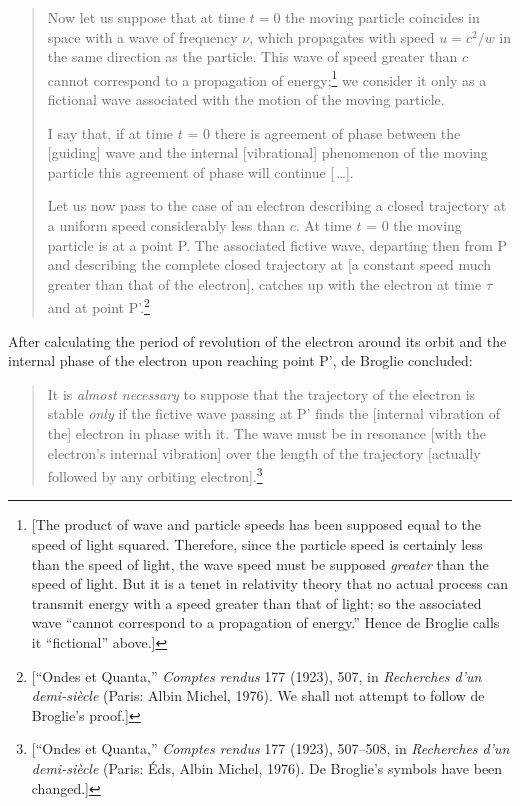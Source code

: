 \begin{quotation}
Now let us suppose that at time $t = 0$ the moving particle
coincides in space with a wave of frequency $\nu$, which propagates
with speed $u = c^2/w$ in the same direction as the
particle. This wave of speed greater than $c$ cannot correspond to
a propagation of energy;\footnote{{[}The product of wave and particle
  speeds has been supposed equal to the speed of light squared.
  Therefore, since the particle speed is certainly less than the speed
  of light, the wave speed must be supposed \emph{greater} than the
  speed of light. But it is a tenet in relativity theory that no actual
  process can transmit energy with a speed greater than that of light;
  so the associated wave ``cannot correspond to a propagation of
  energy.'' Hence de Broglie calls it ``fictional'' above.{]}} we
consider it only as a fictional wave associated with the motion of the
moving particle.

I say that, if at time $t$ = 0 there is agreement of phase between
the {[}guiding{]} wave and the internal {[}vibrational{]} phenomenon of
the moving particle this agreement of phase will continue [\,\ldots].

Let us now pass to the case of an electron describing a closed
trajectory at a uniform speed considerably less than $c$. At time
$t$ = 0 the moving particle is at a point P. The associated fictive
wave, departing then from P and describing the complete closed
trajectory at {[}a constant speed much greater than that of the
electron{]}, catches up with the electron at time $\tau$ and at point
P'.\footnote{{[}``Ondes et Quanta,'' \emph{Comptes rendus} 177
  (1923), 507, in \emph{Recherches d'un demi-siècle} (Paris: Albin
  Michel, 1976). We shall not attempt to follow de Broglie's proof.{]}}
\end{quotation}

After calculating the period of revolution of the electron around its
orbit and the internal phase of the electron upon reaching point P', de
Broglie concluded:

\begin{quote}
It is \emph{almost necessary} to suppose that the trajectory of the
electron is stable \emph{only} if the fictive wave passing at P' finds
the {[}internal vibration of the{]} electron in phase with it. The wave
must be in resonance {[}with the electron's internal vibration{]} over
the length of the trajectory {[}actually followed by any orbiting
electron{]}.\footnote{{[}``Ondes et Quanta,'' \emph{Comptes
  rendus} 177 (1923), 507--508, in \emph{Recherches d'un demi-siècle}
  (Paris: Éds, Albin Michel, 1976). De Broglie's symbols have been
  changed.{]}}
\end{quote}

